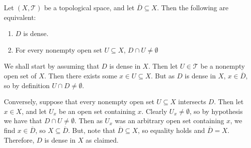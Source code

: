 \documentclass[12pt, a4paper, twoside, openright, titlepage]{book}
\begin{document}
\begin{prop}{}{}
    Let $(X,\mathcal{T})$ be a topological space, and let $\overline{D} \subseteq X$. Then the following are equivalent: \begin{enumerate}
        \item $D$ is dense.
        \item For every nonempty open set $U \subseteq X$, $D\cap U \neq \emptyset$
    \end{enumerate}
\end{prop}
\begin{proof*}
    We shall start by assuming that $D$ is dense in $X$. Then let $U \in \mathcal{T}$ be a nonempty open set of $X$. Then there exists some $x \in U \subseteq X$. But as $D$ is dense in $X$, $x \in \overline{D}$, so by definition $U \cap D \neq \emptyset$.


    Conversely, suppose that every nonempty open set $U\subseteq X$ intersects $D$. Then let $x \in X$, and let $U_x$ be an open set containing $x$. Clearly $U_x \neq \emptyset$, so by hypothesis we have that $D\cap U \neq \emptyset$. Then as $U_x$ was an arbitrary open set containing $x$, we find $x \in \overline{D}$, so $X\subseteq \overline{D}$. But, note that $\overline{D} \subseteq X$, so equality holds and $\overline{D} = X$. Therefore, $D$ is dense in $X$ as claimed.
\end{proof*}
\end{document}
